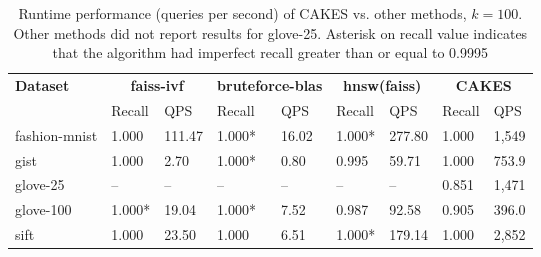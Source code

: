 \begin{table*}[!t]
    \caption{Runtime performance (queries per second) of CAKES vs. other methods, $k=100$. Other methods did not report results for glove-25. Asterisk on recall value indicates that the algorithm had imperfect recall greater than or equal to 0.9995}
    \label{table:results:ann-100}
    \vskip 0.15in
    \begin{center}
    \begin{small}
    \begin{sc}
    \begin{tabular}{|l|p{1cm}|p{1cm}|p{1cm}|p{1cm}|p{1cm}|p{1cm}|p{1cm}|p{1cm}|}
    \textbf{Dataset}  & \multicolumn{2}{|c|}{\textbf{faiss-ivf}} & \multicolumn{2}{|c|}{\textbf{bruteforce-blas}} & \multicolumn{2}{|c|}{\textbf{hnsw(faiss)}} & \multicolumn{2}{|c|}{\textbf{CAKES}} \\
    &                    Recall & QPS                           & Recall & QPS                           & Recall & QPS                                           & Recall & QPS \\
    \hline
    fashion-mnist         & 1.000 & 111.47                           & 1.000* & 16.02                                  & 1.000* & 277.80                                                    & 1.000 & 1,549 \\ 
    \hline
    gist                   & 1.000 & 2.70                           & 1.000* & 0.80                                 & 0.995 & 59.71                                                    & 1.000 & 753.9 \\
    \hline
    glove-25              & -- & --                                & -- & --                                & -- & --                                                    & 0.851 & 1,471 \\
    \hline
    glove-100             & 1.000* &  19.04                          & 1.000* & 7.52                                 & 0.987 & 92.58                                                    & 0.905 & 396.0 \\
    \hline
    sift                  & 1.000 &  23.50                          & 1.000 & 6.51                                  & 1.000* & 179.14                                                    & 1.000 & 2,852 \\                                                 
    \hline
    \end{tabular}
    \end{sc}
    \end{small}
    \end{center}
    \vskip -0.1in
    \end{table*}


